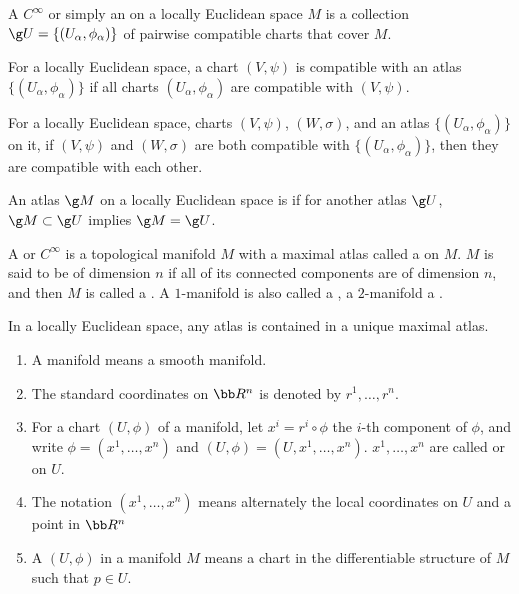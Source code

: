 A $C^\infty$  or simply an  on a locally Euclidean space $M$ is a collection $\g U = \{ (U_\alpha, \phi_\alpha) \}$ of pairwise compatible charts that cover $M$.

For a locally Euclidean space, a chart $(V, \psi)$ is compatible with an atlas $\{(U_\alpha, \phi_\alpha)\}$ if all charts $(U_\alpha, \phi_\alpha)$ are compatible with $(V, \psi)$.

For a locally Euclidean space, charts $(V, \psi)$, $(W, \sigma)$, and an atlas $\{( U_\alpha, \phi_\alpha)\}$ on it, if $(V, \psi)$ and $(W, \sigma)$ are both compatible with $\{(U_\alpha, \phi_\alpha)\}$, then they are compatible with each other.

An atlas $\g M$ on a locally Euclidean space is  if for another atlas $\g U$, $\g M \subset \g U$ implies $\g M = \g U$.

A  or $C^\infty$  is a topological manifold $M$ with a maximal atlas called a  on $M$. $M$ is said to be of dimension $n$ if all of its connected components are of dimension $n$, and then $M$ is called a . A $1$-manifold is also called a , a $2$-manifold a .

In a locally Euclidean space, any atlas is contained in a unique maximal atlas.

\begin{enumerate}
  \item A manifold means a smooth manifold.
  \item The standard coordinates on $\bb R^n$ is denoted by $r^1, \dotsc, r^n$.
  \item For a chart $(U, \phi)$ of a manifold, let $x^i = r^i \circ \phi$ the $i$-th component of $\phi$, and write $\phi = (x^1, \dotsc, x^n)$ and $(U, \phi) = (U, x^1, \dotsc, x^n)$. $x^1, \dotsc, x^n$ are called  or  on $U$.
  \item The notation $(x^1, \dotsc, x^n)$ means alternately the local coordinates on $U$ and a point in $\bb R^n$
  \item A  $(U, \phi)$  in a manifold $M$ means a chart in the differentiable structure of $M$ such that $p \in U$.
\end{enumerate}

